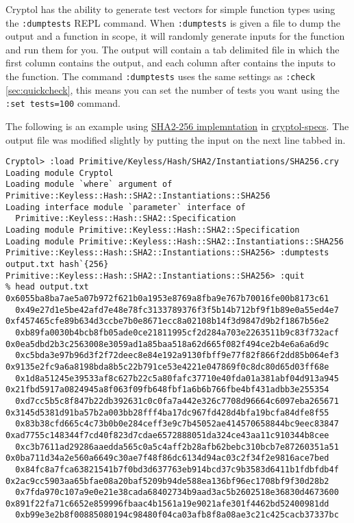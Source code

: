Cryptol has the ability to generate test vectors for simple function types using the \texttt{:dumptests} REPL command.
When \texttt{:dumptests} is given a file to dump the output and a function in scope, it will randomly generate inputs for the function and run them for you.
The output will contain a tab delimited file in which the first column contains the output, and each column after contains the inputs to the function.
The command \texttt{:dumptests} uses the same settings as \texttt{:check} \ref{sec:quickcheck}, this means you can set the number of tests you want using the \texttt{:set tests=100} command.

The following is an example using \href{https://github.com/GaloisInc/cryptol-specs/blob/7468d170f5e9e3913cd12e29c76d8c041ef99dd0/Primitive/Keyless/Hash/SHA2/Instantiations/SHA256.cry}{SHA2-256 implemntation} in \href{https://github.com/GaloisInc/cryptol-specs}{cryptol-specs}.
The output file was modified slightly by putting the input on the next line tabbed in. 
\begin{Verbatim}
Cryptol> :load Primitive/Keyless/Hash/SHA2/Instantiations/SHA256.cry
Loading module Cryptol
Loading module `where` argument of Primitive::Keyless::Hash::SHA2::Instantiations::SHA256
Loading interface module `parameter` interface of 
  Primitive::Keyless::Hash::SHA2::Specification
Loading module Primitive::Keyless::Hash::SHA2::Specification
Loading module Primitive::Keyless::Hash::SHA2::Instantiations::SHA256
Primitive::Keyless::Hash::SHA2::Instantiations::SHA256> :dumptests output.txt hash`{256}
Primitive::Keyless::Hash::SHA2::Instantiations::SHA256> :quit
% head output.txt                                                        
0x6055ba8ba7ae5a07b972f621b0a1953e8769a8fba9e767b70016fe00b8173c61
  0x49e27d1e5be42afd7e48e78fc3133789376f3f5b14b712bf9f1b89e0a55ed4e7
0xf457465cfe89b634d3ccbe7b0e8671ecc8a02108b14f3d9847d9b2f1867b56e2
  0xb89fa0030b4bcb8fb05ade0ce21811995cf2d284a703e2263511b9c83f732acf
0x0ea5dbd2b3c2563008e3059ad1a85baa518a62d665f082f494ce2b4e6a6a6d9c
  0xc5bda3e97b96d3f2f72deec8e84e192a9130fbff9e77f82f866f2dd85b064ef3
0x9135e2fc9a6a8198bda8b5c22b791ce53e4221e047869f0c8dc80d65d03ff68e
  0x1d8a51245e39533af8c627b22c5a80fafc37710e40fda01a381abf04d913a945
0x21fbd5917a0824945a8f063f09fb648fbf1a6b6b766fbe4bf431adbb3e255354
  0xd7cc5b5c8f847b22db392631c0c0fa7a442e326c7708d96664c6097eba265671
0x3145d5381d91ba57b2a003bb28fff4ba17dc967fd428d4bfa19bcfa84dfe8f55
  0x83b38cfd665c4c73b0b0e284ceff3e9c7b45052ae414570658844bc9eec83847
0xad7755c148344f7cd40f823d7cdae6572888051da324ce43aa11c910344b8cee
  0xc3b7611ad29286aaedda565c0a5c4aff2b28afb62bebc310bcb7e87260351a51
0x0ba711d34a2e560a6649c30ae7f48f86dc6134d94ac03c2f34f2e9816ace7bed
  0x84fc8a7fca63821541b7f0bd3d637763eb914bcd37c9b3583d6411b1fdbfdb4f
0x2ac9cc5903aa65bfae08a20baf5209b94de588ea136bf96ec1708bf9f30d28b2
  0x7fda970c107a9e0e21e38cada68402734b9aad3ac5b2602518e36830d4673600
0x891f22fa71c6652e859996fbaac4b1561a19e9021afe301f4462bd52400981dd
  0xb99e3e2b8f00885080194c98480f04ca03afb8f8a08ae3c21c425cacb37337bc
\end{Verbatim}


